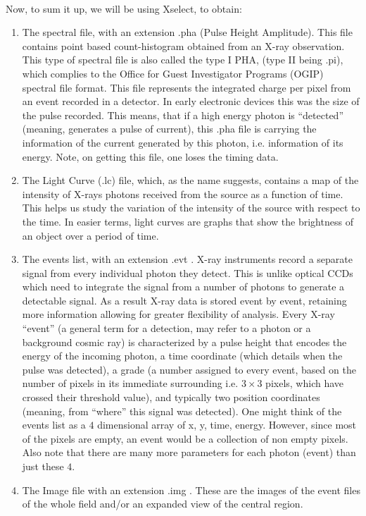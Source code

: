 \documentclass[a4paper,twoside]{report}
\numberwithin{equation}{section}
\begin{document}
\paragraph{}
Now, to sum it up, we will be using Xselect, to obtain:
\begin{enumerate}
\item The spectral file, with an extension .pha (Pulse Height Amplitude). This file contains point based  count-histogram obtained from an X-ray observation. This type of spectral file is also called the type I PHA, (type II being .pi), which complies to the Office for Guest Investigator Programs (OGIP) spectral file format. This file represents the integrated charge per pixel from an event recorded in a detector. In early electronic devices this was the size of the pulse recorded. This means, that if a high energy photon is “detected” (meaning, generates a pulse of current), this .pha file is carrying the information of the current generated by this photon, i.e. information of its energy. Note, on getting this file, one loses the timing data.
\item The Light Curve (.lc) file, which, as the name suggests, contains a map of the intensity of X-rays photons received from the source as a function of time. This helps us study the variation of the intensity of the source with respect to the time. In easier terms, light curves are graphs that show the brightness of an object over a period of time. 
\item The events list, with an extension .evt . X-ray instruments record a separate signal from every individual photon they detect. This is unlike optical CCDs which need to integrate the signal from a number of photons to generate a detectable signal. As a result X-ray data is stored event by event, retaining more information allowing for greater flexibility of analysis. Every X-ray “event” (a general term for a detection, may refer to a photon or a background cosmic ray) is characterized by a pulse height that encodes the energy of the incoming photon, a time coordinate (which details when the pulse was detected), a grade (a number assigned to every event, based on the number of pixels in its immediate surrounding i.e. $3 \times 3$ pixels, which have crossed their threshold value), and typically two position coordinates (meaning, from “where” this signal was detected). One might think of the events list as a $4$ dimensional array of x, y, time, energy. However, since most of the pixels are empty, an event would be a collection of non empty pixels. Also note that there are many more parameters for each photon (event) than just these $4$. 
\item The Image file with an extension .img . These are the images of the event files of the whole field and/or an expanded view of the central region. 
\end{enumerate}
\end{document}
